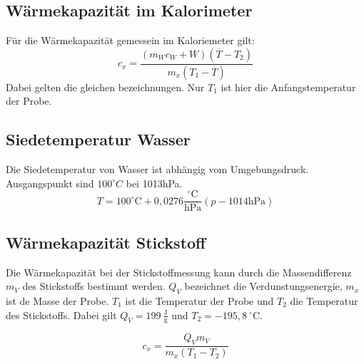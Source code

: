 \subsection{Wärmekapazität im Kalorimeter}
Für die Wärmekapazität gemessein im Kaloriemeter gilt:
\begin{equation}
    c_x = \frac{(m_W c_W + W)(\overline{T} - T_2)}{m_x (T_1 - \overline{T})} \label{eq:KalC}
\end{equation}
Dabei gelten die gleichen bezeichnungen. Nur $T_1$ ist hier die Anfangstemperatur der Probe.
\subsection{Siedetemperatur Wasser}
Die Siedetemperatur von Wasser ist abhängig vom Umgebungsdruck. Ausgangspunkt sind $100 ^\circ C$ bei 1013hPa.
\begin{equation}
    T = 100^\circ \text{C} + 0,0276 \frac{^\circ \text{C}}{\text{hPa}}(p -1014 \text{hPa})
    \label{eq:Siedetemperatur}
\end{equation}
\subsection{Wärmekapazität Stickstoff}
Die Wärmekapazität bei der Stickstoffmessung kann durch die Massendifferenz $m_V$ des Stickstoffs bestimmt werden.
$Q_V$ bezeichnet die Verdunstungsenergie, $m_x$ ist de Masse der Probe.
$T_1$ ist die Temperatur der Probe und $T_2$ die Temperatur des Stickstoffs.
Dabei gilt $Q_V = 199\ \tfrac{\text{J}}{\text{g}}$ und $T_2 = -195,8\  ^\circ \text{C}$.

\begin{equation}
    c_x = \frac{Q_V m_V}{m_x(T_1-T_2)}
    \label{eq:cN}
\end{equation}
